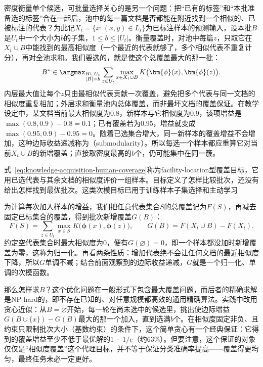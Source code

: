 密度衡量单个候选，可批量选择关心的是另一个问题：把“已有的标签”和“本批准备选的标签”合在一起后，池中的每一篇文档是否都能在附近找到一个相似的、已被标注的代表？为此记$X_t=\{x:(x,y)\in L_t\}$为已标注样本的预测输入，设本批$B$是$U_t$中一个大小为$b$的子集，$1\leq b\leq|U_t|$。衡量覆盖时，对池中每篇$z$，只取它在$X_t\cup B$中能找到的最高相似度（一个最近的代表就够了，多个相似代表不重复计分），再对全池求和。我们要选的，就是使这个总覆盖最大的那一批：
\begin{equation}
  B^\ast\in\argmax_{\substack{B\subseteq U_t\\|B|=b}}
  \sum_{z\in U_t}
  \max_{x\in X_t\cup B}
  K\bigl(\bm{\phi}(x),\bm{\phi}(z)\bigr).
  \label{eq:knowledge-acquisition-human-coverage}
\end{equation}
内层最大值让每个$z$只由最相似代表贡献一次覆盖，避免把多个代表与同一文档的相似度重复相加；外层求和衡量池内总体覆盖，而非最坏文档的覆盖保证。在教学设定中，某文档当前最大相似度为$0.8$，新样本与它相似度为$0.9$，该项增益是$\max(0.8,0.9)-0.8=0.1$；已有覆盖若为$0.95$，增益就变成$\max(0.95,0.9)-0.95=0$。随着已选集合增大，同一新样本的覆盖增益不会增加，这种边际收益递减称为（submodularity）。所以每选一个样本都应重算它对当前$X_t\cup B$的新增覆盖；直接取密度最高的$b$个，仍可能集中在同一簇。

式~\eqref{eq:knowledge-acquisition-human-coverage}称为facility-location型覆盖目标，它用已选代表与其余文档的相似度评价一组样本。目标定义了怎样比较批次，还没有给出怎样找到最优批次。这类次模目标已用于训练样本子集选择和主动学习

为计算每次加入样本的增益，我们把任意代表集合$S$的总覆盖记为$F(S)$，再减去固定已标集合的覆盖，得到批次新增覆盖$G(B)$：
\[
  F(S)=\sum_{z\in U_t}\max_{x\in S}
  K\bigl(\bm{\phi}(x),\bm{\phi}(z)\bigr),
  \qquad
  G(B)=F(X_t\cup B)-F(X_t).
\]
约定空代表集合时最大相似度为0，便有$G(\varnothing)=0$，即一个样本都没加时新增覆盖为零，这称为归一化。再看两条性质：增加代表绝不会让任何文档的最近相似度下降，所以$G$单调不减；结合前面观察到的边际收益递减，$G$就是一个归一化、单调的次模函数。

那么怎样求$B$？这个优化问题在一般形式下包含最大覆盖问题，而后者的精确求解是NP-hard的，即不存在已知的、对任意规模都高效的通用精确算法。实践中改用贪心近似：从$B=\varnothing$开始，每一轮在尚未选中的候选里，挑出使边际增益$G(B\cup\{x\})-G(B)$最大的那一个加入，直到选满$b$个。在相似度固定非负、且约束只限制批次大小（基数约束）的条件下，这个简单贪心有一个经典保证：它得到的覆盖增益至少不低于最优解的$1-1/e$（约$63\%$）。但要注意，这个保证的对象仅仅是“相似度覆盖”这个代理目标，并不等于保证分类准确率提高——覆盖得更均匀，最终任务未必一定更好。

